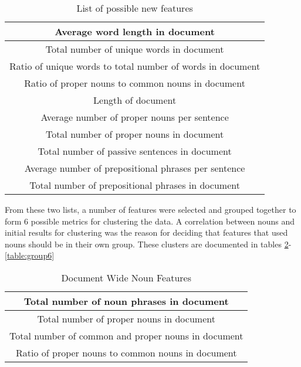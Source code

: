 \documentclass[]{article}
\begin{document}
\begin{table}[!htbp]
	\begin{center}
		\begin{tabular}{| c |} \hline
			Average word length in document \\ \hline
			Total number of unique words in document\\ \hline
			Ratio of unique words to total number of words in document \\ \hline
			Ratio of proper nouns to common nouns in document \\ \hline
			Length of document \\ \hline
			Average number of proper nouns per sentence \\ \hline
			Total number of proper nouns in document \\ \hline
			Total number of passive sentences in document \\ \hline
			Average number of prepositional phrases per sentence \\ \hline
			Total number of prepositional phrases in document \\ \hline
		\end{tabular}
	\end{center}
	\caption{List of possible new features}
	\label{table:features2}
\end{table}

From these two lists, a number of features were selected and grouped together to form 6 possible metrics for clustering the data.
A correlation between nouns and initial results for clustering was the reason for deciding that features that used nouns should be in their own group.
These clusters are documented in tables \ref{table:group1}-\ref{table:group6}

\begin{table}[!htbp]
	\begin{center}
		\begin{tabular}{| c |} \hline
			Total number of noun phrases in document \\ \hline
      Total number of proper nouns in document \\ \hline
			Total number of common and proper nouns in document \\ \hline
			Ratio of proper nouns to common nouns in document \\ \hline
		\end{tabular}
	\end{center}
	\caption{Document Wide Noun Features}
	\label{table:group1}
\end{table}
\end{document}
